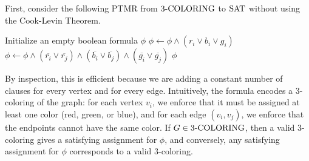 \documentclass[11pt,addpoints,answers]{exam}
\begin{document}
\begin{questions}
    First, consider the following PTMR from $\text{3-COLORING}$ to $\text{SAT}$ without using the Cook-Levin Theorem.

    \begin{minipage}
    {\linewidth}
    \centering 
        \begin{algorithm}[H]
        \begin{algorithmic}[1]
            \State Initialize an empty boolean formula $\phi$
                \State $\phi \gets \phi \land (r_i \lor b_i \lor g_i) $
            \EndFor
                \State $\phi \gets \phi \land (\overline{r_i} \lor \overline{r_j}) \land (\overline{b_i} \lor \overline{b_j}) \land (\overline {g_i} \lor \overline {g_j})$
            \EndFor
            \State \Return $\phi$
            \EndFunction
        \end{algorithmic}
        \end{algorithm}
    \end{minipage}


     By inspection, this is efficient because we are adding a constant number of clauses for every vertex and for every edge. Intuitively, the formula encodes a 3-coloring of the graph: for each vertex $v_i$, we enforce that it must be assigned at least one color (red, green, or blue), and for each edge $(v_i, v_j)$, we enforce that the endpoints cannot have the same color. If $G \in \text{3-COLORING}$, then a valid 3-coloring gives a satisfying assignment for $\phi$, and conversely, any satisfying assignment for $\phi$ corresponds to a valid 3-coloring.


\end{questions}
\end{document}
